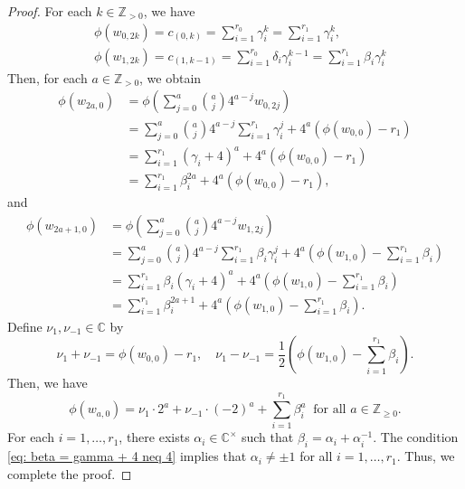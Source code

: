 \documentclass[12pt,a4paper]{amsart}
\theoremstyle{definition}
\numberwithin{equation}{subsection}
\begin{document}
\begin{proof}
  For each $k \in \mathbb{Z}_{> 0}$, we have
  \begin{align*}
    &\phi(w_{0,2k}) = c_{(0,k)} = \sum_{i=1}^{r_0} \gamma_i^k = \sum_{i=1}^{r_1} \gamma_i^k,\\
    &\phi(w_{1,2k}) = c_{(1,k-1)} = \sum_{i=1}^{r_0} \delta_i \gamma_i^{k-1} = \sum_{i=1}^{r_1} \beta_i \gamma_i^{k}
  \end{align*}
  Then, for each $a \in \mathbb{Z}_{> 0}$, we obtain
  \begin{align*}
    \phi(w_{2a,0})
    &= \phi(\sum_{j=0}^a \binom{a}{j} 4^{a-j} w_{0,2j})\\
    &= \sum_{j=0}^a \binom{a}{j} 4^{a-j} \sum_{i=1}^{r_1} \gamma_i^j + 4^a(\phi(w_{0,0})-r_1)\\
    &= \sum_{i=1}^{r_1} (\gamma_i+4)^a + 4^a(\phi(w_{0,0})-r_1)\\
    &= \sum_{i=1}^{r_1} \beta_i^{2a} + 4^a(\phi(w_{0,0})-r_1),
  \end{align*}
  and
  \begin{align*}
    \phi(w_{2a+1,0})
    &= \phi(\sum_{j=0}^a \binom{a}{j} 4^{a-j} w_{1,2j})\\
    &= \sum_{j=0}^a \binom{a}{j} 4^{a-j} \sum_{i=1}^{r_1} \beta_i \gamma_i^j + 4^a(\phi(w_{1,0})-\sum_{i=1}^{r_1} \beta_i)\\
    &= \sum_{i=1}^{r_1} \beta_i (\gamma_i+4)^a + 4^a(\phi(w_{1,0})-\sum_{i=1}^{r_1} \beta_i)\\
    &= \sum_{i=1}^{r_1} \beta_i^{2a+1} + 4^a(\phi(w_{1,0})-\sum_{i=1}^{r_1} \beta_i).
  \end{align*}
  Define $\nu_1,\nu_{-1} \in \mathbb{C}$ by
  \[
    \nu_1+\nu_{-1} = \phi(w_{0,0})-r_1, \quad \nu_1-\nu_{-1} = \frac{1}{2}(\phi(w_{1,0})-\sum_{i=1}^{r_1} \beta_i).
  \]
  Then, we have
  \[
    \phi(w_{a,0}) = \nu_1 \cdot 2^a + \nu_{-1} \cdot (-2)^a + \sum_{i=1}^{r_1} \beta_i^a \ \text{ for all } a \in \mathbb{Z}_{\geq 0}.
  \]
  For each $i = 1,\dots,r_1$, there exists $\alpha_i \in \mathbb{C}^\times$ such that $\beta_i = \alpha_i + \alpha_i^{-1}$.
  The condition \eqref{eq: beta = gamma + 4 neq 4} implies that $\alpha_i \neq \pm 1$ for all $i = 1,\dots,r_1$.
  Thus, we complete the proof.
\end{proof}
\end{document}
